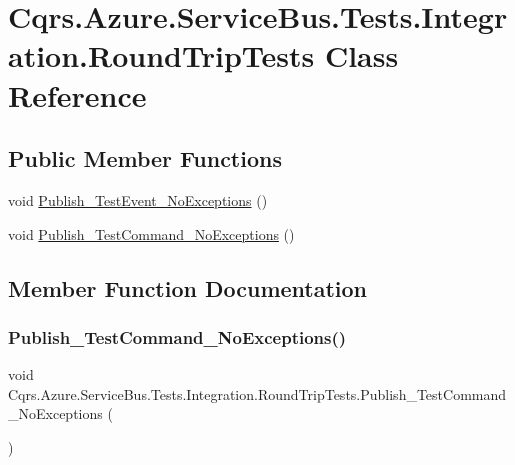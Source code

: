 \hypertarget{classCqrs_1_1Azure_1_1ServiceBus_1_1Tests_1_1Integration_1_1RoundTripTests}{}\section{Cqrs.\+Azure.\+Service\+Bus.\+Tests.\+Integration.\+Round\+Trip\+Tests Class Reference}
\label{classCqrs_1_1Azure_1_1ServiceBus_1_1Tests_1_1Integration_1_1RoundTripTests}
\subsection*{Public Member Functions}
\begin{DoxyCompactItemize}
\item 
void \hyperlink{classCqrs_1_1Azure_1_1ServiceBus_1_1Tests_1_1Integration_1_1RoundTripTests_a35eab43e8a250d844db0d3f5931394ae_a35eab43e8a250d844db0d3f5931394ae}{Publish\+\_\+\+Test\+Event\+\_\+\+No\+Exceptions} ()
\item 
void \hyperlink{classCqrs_1_1Azure_1_1ServiceBus_1_1Tests_1_1Integration_1_1RoundTripTests_a5f10c6d0a447991a5d689f17f54a87e5_a5f10c6d0a447991a5d689f17f54a87e5}{Publish\+\_\+\+Test\+Command\+\_\+\+No\+Exceptions} ()
\end{DoxyCompactItemize}


\subsection{Member Function Documentation}
\mbox{\label{classCqrs_1_1Azure_1_1ServiceBus_1_1Tests_1_1Integration_1_1RoundTripTests_a5f10c6d0a447991a5d689f17f54a87e5_a5f10c6d0a447991a5d689f17f54a87e5}} 
\subsubsection{\texorpdfstring{Publish\+\_\+\+Test\+Command\+\_\+\+No\+Exceptions()}{Publish\_TestCommand\_NoExceptions()}}
{\footnotesize\ttfamily void Cqrs.\+Azure.\+Service\+Bus.\+Tests.\+Integration.\+Round\+Trip\+Tests.\+Publish\+\_\+\+Test\+Command\+\_\+\+No\+Exceptions (\begin{DoxyParamCaption}{ }\end{DoxyParamCaption})}

